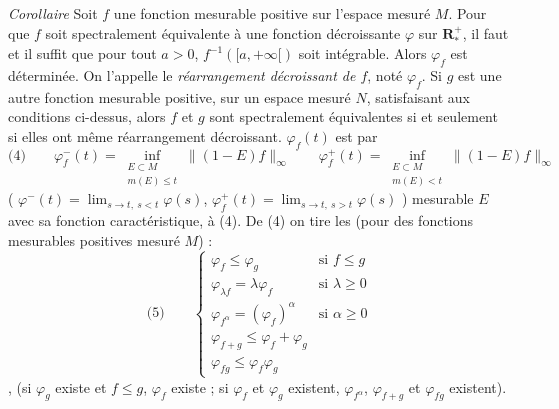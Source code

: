 \documentclass[11pt,a4paper]{article}
\begin{document}
\emph{Corollaire} Soit $f$ une fonction mesurable positive sur l'espace mesuré $M$. Pour que $f$ soit spectralement équivalente à une fonction décroissante $\varphi$ sur $\mathbf{R}^{+}_{*}$, il faut et il suffit que pour tout $a > 0$, $f^{-1}([a, +\infty[)$ soit intégrable. Alors $\varphi_f$  est  déterminée.  On l'appelle le \emph{réarrangement décroissant de $f$}, noté $\varphi_f$. Si \struck{\ill{}} $g$ est une autre fonction mesurable positive, sur un espace mesuré $N$, satisfaisant aux conditions ci-dessus, alors $f$ et $g$ sont spectralement \struck{\ill{}} équivalentes si et seulement si elles ont même réarrangement décroissant. \struck{\ill{}}  $\varphi_f(t)$ est  par
\[
  \text{(4)}\qquad \varphi_f^{-}(t) = \inf_{\substack{E \subset M\\ m(E) \leq t}} \|(1-E)f\|_\infty \qquad
  \varphi_f^{+}(t) = \inf_{\substack{E \subset M\\ m(E) < t}} \|(1-E)f\|_\infty
\]
(   $\varphi^{-}(t) = \lim_{s \to t,\ s < t} \varphi(s)$, $\varphi_f^{+}(t) = \lim_{s \to t,\ s > t} \varphi(s)$ )   mesurable $E$ avec sa fonction caractéristique,  à (4). De (4) on tire les  (pour des fonctions mesurables positives   mesuré $M$) \struck{\ill{}}  :
\[
  \text{(5)}\qquad \left\{
  \begin{array}{ll}
    \varphi_f \leq \varphi_g & \text{si } f \leq g \\
    \varphi_{\lambda f} = \lambda\varphi_f & \text{si } \lambda \geq 0 \\
    \varphi_{f^\alpha} = (\varphi_f)^\alpha & \text{si } \alpha \geq 0 \\
    \varphi_{f+g} \leq \varphi_f + \varphi_g & \\
    \varphi_{fg} \leq \varphi_f\varphi_g &
  \end{array}\right.
\]
, (si $\varphi_g$ existe et $f \leq g$, $\varphi_f$ existe  ; si $\varphi_f$ et $\varphi_g$ existent, $\varphi_{f^\alpha}$, $\varphi_{f+g}$ et $\varphi_{fg}$ existent). 
\end{document}
